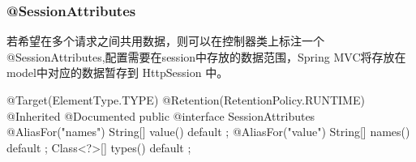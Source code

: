 \subsubsection{@SessionAttributes}

若希望在多个请求之间共用数据，则可以在控制器类上标注一个 @SessionAttributes,配置需要在session中存放的数据范围，Spring MVC将存放在model中对应的数据暂存到 HttpSession 中。

\begin{Java}
@Target({ElementType.TYPE})
@Retention(RetentionPolicy.RUNTIME)
@Inherited
@Documented
public @interface SessionAttributes {
    @AliasFor("names")
    String[] value() default {};
    @AliasFor("value")
    String[] names() default {};
    Class<?>[] types() default {};
}
\end{Java}








\newpage